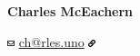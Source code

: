 \documentclass[11pt,letterpaper]{article}
\newcommand{\hbump}{\hspace{0.4in}}
\newcommand{\hbmp}{\hspace{0.02in}}
\newcommand{\iconsize}{8px}
\begin{document}


\begin{center}
    { \Huge \textbf{Charles McEachern} }

    \vspace{12pt}
    \includegraphics[height=\iconsize]{icons/envelope-regular.png}
%    
    \hbmp
    \href{mailto:ch@rles.uno}{ch@rles.uno}
    \hbump
    \includegraphics[height=\iconsize]{icons/link-solid.png}

\end{center}
\end{document}
